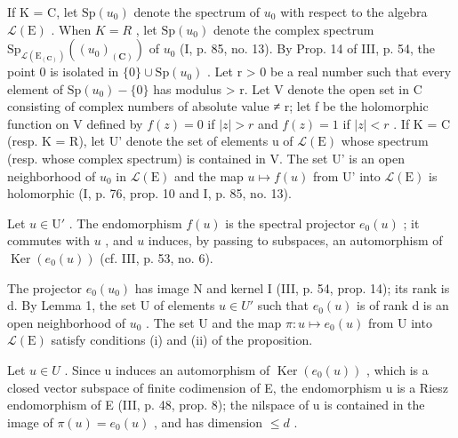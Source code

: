 If K = C, let \(\mathrm{Sp}(u_{0})\) denote the spectrum of \(u_{0}\) with respect to the algebra \(\mathcal{L}(\mathrm{E})\) . When \(K = R\) , let \(\mathrm{Sp}(u_{0})\) denote the complex spectrum \(\mathrm{Sp}_{\mathcal{L}(\mathrm{E}_{(\mathbf{C})})}((u_{0})_{(\mathbf{C})})\) of \(u_{0}\) (I, p. 85, no. 13). By Prop. 14 of III, p. 54, the point 0 is isolated in \(\{0\} \cup \mathrm{Sp}(u_{0})\) . Let r \textgreater{} 0 be a real number such that every element of \(\mathrm{Sp}(u_{0}) - \{0\}\) has modulus \textgreater{} r. Let V denote the open set in C consisting of complex numbers of absolute value ≠ r; let f be the holomorphic function on V defined by \(f(z) = 0\) if \(|z| > r\) and \(f(z) = 1\) if \(|z| < r\) . If K = C (resp. K = R), let U' denote the set of elements u of \(\mathcal{L}(\mathrm{E})\) whose spectrum (resp. whose complex spectrum) is contained in V. The set U' is an open neighborhood of \(u_{0}\) in \(\mathcal{L}(\mathrm{E})\) and the map \(u \mapsto f(u)\) from U' into \(\mathcal{L}(\mathrm{E})\) is holomorphic (I, p. 76, prop. 10 and I, p. 85, no. 13).

Let \(u \in \mathrm{U}'\) . The endomorphism \(f(u)\) is the spectral projector \(e_0(u)\) ; it commutes with \(u\) , and \(u\) induces, by passing to subspaces, an automorphism of \(\operatorname{Ker}(e_0(u))\) (cf. III, p. 53, no. 6).

The projector \(e_{0}(u_{0})\) has image N and kernel I (III, p. 54, prop. 14); its rank is d. By Lemma 1, the set U of elements \(u \in U'\) such that \(e_{0}(u)\) is of rank d is an open neighborhood of \(u_{0}\) . The set U and the map \(\pi: u \mapsto e_{0}(u)\) from U into \(\mathcal{L}(\mathrm{E})\) satisfy conditions (i) and (ii) of the proposition.

Let \(u \in U\) . Since u induces an automorphism of \(\operatorname{Ker}(e_{0}(u))\) , which is a closed vector subspace of finite codimension of E, the endomorphism u is a Riesz endomorphism of E (III, p. 48, prop. 8); the nilspace of u is contained in the image of \(\pi(u) = e_{0}(u)\) , and has dimension \(\leqslant d\) .

